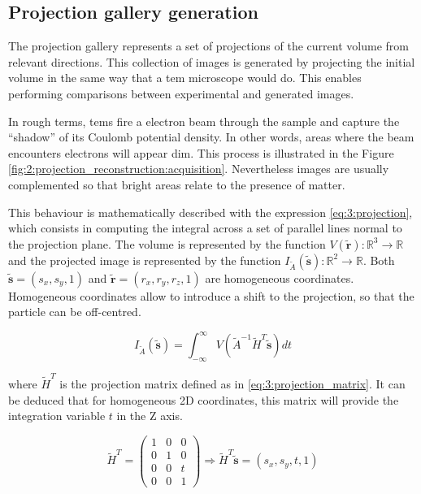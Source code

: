 \documentclass[../main.tex]{subfiles}
\begin{document}
\subsection{Projection gallery generation}
The projection gallery represents a set of projections of the current volume from relevant directions. This collection of images is generated by projecting the initial volume in the same way that a \gls{tem} microscope would do. This enables performing comparisons between experimental and generated images. 

In rough terms, \glspl{tem} fire a electron beam through the sample and capture the ``shadow'' of its Coulomb potential density\cite{sorzano2022}. In other words, areas where the beam encounters electrons will appear dim. This process is illustrated in the Figure \ref{fig:2:projection_reconstruction:acquisition}. Nevertheless images are usually complemented so that bright areas relate to the presence of matter.

This behaviour is mathematically described with the expression \eqref{eq:3:projection}, which consists in computing the integral across a set of parallel lines normal to the projection plane. The volume is represented by the function $V(\bm{\tilde{r}}): \mathbb{R}^3 \rightarrow \mathbb{R}$ and the projected image is represented by the function $I_{\tilde{A}}(\bm{\tilde{s}}): \mathbb{R}^2 \rightarrow \mathbb{R}$. Both $\bm{\tilde{s}} = (s_x, s_y, 1)$ and $\bm{\tilde{r}} = (r_x, r_y, r_z, 1)$ are homogeneous coordinates\cite{sorzano2017b}. Homogeneous coordinates allow to introduce a shift to the projection, so that the particle can be off-centred.

\begin{equation}\label{eq:3:projection}
    I_{\tilde{A}}(\bm{\tilde{s}}) =
    \int_{-\infty}^{\infty} V(\tilde{A}^{-1}\tilde{H}^T\bm{\tilde{s}}) dt
\end{equation}

where $\tilde{H}^T$ is the projection matrix defined as in \eqref{eq:3:projection_matrix}. It can be deduced that for homogeneous 2D coordinates, this matrix will provide the integration variable $t$ in the Z axis.

\begin{equation}\label{eq:3:projection_matrix}
    \tilde{H}^T = 
    \begin{pmatrix}
        1 & 0 & 0 \\
        0 & 1 & 0 \\
        0 & 0 & t \\
        0 & 0 & 1
    \end{pmatrix}
    \Rightarrow
    \tilde{H}^T \bm{\tilde{s}} =
    (s_x, s_y, t, 1)
\end{equation}
\end{document}
